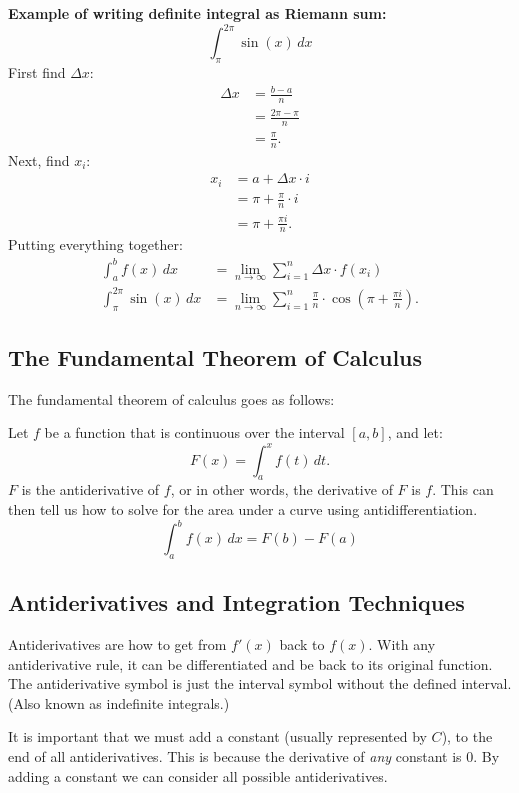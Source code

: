 \documentclass[12pt]{article}
\begin{document}
\textbf{Example of writing definite integral as Riemann sum:}
\[ \int_{\pi}^{2 \pi} \sin(x) \, dx \]
First find $\Delta x$:
\begin{align*}
    \Delta x & = \frac{b-a}{n}         \\[6pt]
             & = \frac{2 \pi - \pi}{n} \\[6pt]
             & = \frac{\pi}{n}.
\end{align*}
Next, find $x_i$:
\begin{align*}
    x_i & = a + \Delta x \cdot i        \\
        & = \pi + \frac{\pi}{n} \cdot i \\[6pt]
        & = \pi + \frac{\pi i}{n}.
\end{align*}
Putting everything together:
\begin{align*}
    \int_{a}^{b} f(x) \, dx          & = \lim_{n \to \infty} \sum_{i=1}^{n} \Delta x \cdot f(x_i)                                           \\[6pt]
    \int_{\pi}^{2 \pi} \sin(x) \, dx & = \lim_{n \to \infty} \sum_{i=1}^{n} \frac{\pi}{n} \cdot \cos{\left( \pi + \frac{\pi i}{n} \right)}.
\end{align*}

\subsection{The Fundamental Theorem of Calculus}
\noindent The fundamental theorem of calculus goes as follows:

\noindent Let $f$ be a function that is continuous over the interval $[a, b]$, and let:
\[ F(x) = \int_{a}^{x} f(t) \, dt. \]
$F$ is the antiderivative of $f$, or in other words, the derivative of $F$ is $f$. This can then tell us how to solve for the area under a curve using antidifferentiation.
\[ \int_{a}^{b} f(x) \, dx = F(b) - F(a) \]

\subsection{Antiderivatives and Integration Techniques}
Antiderivatives are how to get from $f'(x)$ back to $f(x)$. With any antiderivative rule, it can be differentiated and be back to its original function. The antiderivative symbol is just the interval symbol without the defined interval. (Also known as indefinite integrals.)

It is important that we must add a constant (usually represented by $C$), to the end of all antiderivatives. This is because the derivative of \textit{any} constant is $0$. By adding a constant we can consider all possible antiderivatives. %
\end{document}
